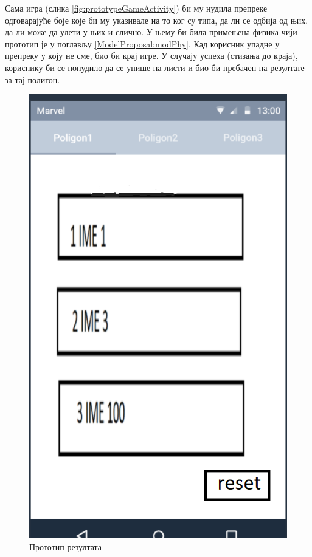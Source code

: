 Сама игра (слика \ref{fig:prototypeGameActivity}) би му нудила препреке одговарајуће боје које би му указивале на то ког су типа, да ли се одбија од њих. да ли може да улети у њих и слично. У њему би била примењена физика чији прототип је у поглављу \ref{ModelProposal:modPhy}. Кад корисник упадне у препреку у коју не сме, био би крај игре. У случају успеха (стизања до краја), кориснику би се понудило да се упише на листи и био би пребачен на резултате за тај  полигон. 

\begin{figure}[htb!]
\begin{center}
\includegraphics[scale=.5]{pictures/prototype/resultsActivity}
\caption{Прототип резултата}\label{fig:prototypeResults}
\end{center}
\end{figure}

